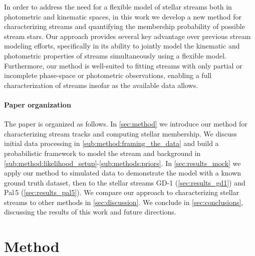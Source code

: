\documentclass[twocolumn]{aastex631}
\newcommand{\stream}[1]{#1}
\begin{document}
    In order to address the need for a flexible model of stellar streams both in
    photometric and kinematic spaces, in this work we develop a new method for
    characterizing streams and quantifying the membership probability of
    possible stream stars. Our approach provides several key advantage over
    previous stream modeling efforts, specifically in its ability to jointly
    model the kinematic and photometric properties of streams simultaneously
    using a flexible model.  Furthermore, our method is well-suited to fitting
    streams with only partial or incomplete phase-space or photometric
    observations, enabling a full characterization of streams insofar as the
    available data allows.

    \paragraph{Paper organization}

        The paper is organized as follows.  In \autoref{sec:method} we introduce
        our method for characterizing stream tracks and computing stellar
        membership.  We discuss initial data processing in
        \autoref{sub:method:framing_the_data} and build a probabilistic
        framework to model the stream and background in
        \autoref{sub:method:likelihood_setup}-\autoref{sub:methods:priors}.  In
        \autoref{sec:results_mock} we apply our method to simulated data to
        demonstrate the model with a known ground truth dataset, then to the
        stellar streams \stream{GD-1} (\autoref{sec:results_gd1}) and
        \stream{Pal\,5} (\autoref{sec:results_pal5}).  We compare our approach
        to characterizing stellar streams to other methods in
        \autoref{sec:discussion}.  We conclude in \autoref{sec:conclusions},
        discussing the results of this work and future directions.


\section{Method} \label{sec:method}
\end{document}

